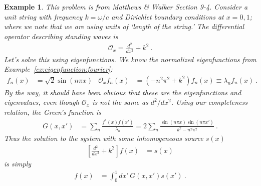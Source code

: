 \documentclass[
  11pt,
	colorful,
	raggedright,
]{tufte-style-thesis-flip}
\newtheorem{example}{Example}[section]
\begin{document}
\begin{example}
This problem is from Matthews \& Walker Section 9-4. Consider a unit string with frequency $k= \omega/c$ and Dirichlet boundary conditions at $x=0,1$; where we note that we are using units of `length of the string.' The differential operator describing standing waves is
\begin{align}
  \mathcal O_x = \frac{d^2}{dx^2} + k^2 \ .
 \end{align}
Let's solve this using eigenfunctions. We know the normalized eigenfunctions from Example~\ref{ex:eigenfunction:fourier}:
\begin{align}
  f_n(x) &= \sqrt{2} \sin (n\pi x) 
  &
  \mathcal O_x f_n(x) 
  & = \left(-n^2\pi^2 + k^2\right)f_n(x) \equiv \lambda_n f_n(x) \ .
\end{align}
By the way, it should  have been \emph{obvious} that these are the eigenfunctions and eigenvalues, even though $\mathcal O_x$ is \emph{not} the same as $d^2/dx^2$. Using our completeness relation, the Green's function is
\begin{align}
  G(x,x') &= \sum_n \frac{f^*(x)f(x')}{\lambda_n}
  =
  2\sum_n\frac{\sin(n\pi x) \sin (n\pi x')}{k^2 - n^2\pi^2} \ .
\end{align}
Thus the solution to the system with some inhomogeneous source $s(x)$
\begin{align}
  \left[\frac{d^2}{dx^2} + k^2\right] f(x) &= s(x)
\end{align}
is simply
\begin{align}
  f(x) &= \int_0^1 dx' \, G(x,x') s(x') \ .
\end{align}
\end{example}
\end{document}
